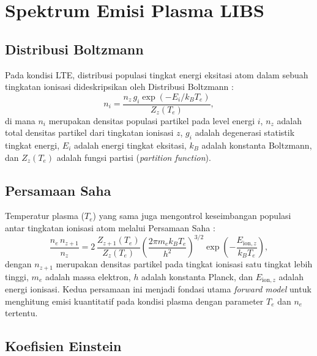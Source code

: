 \section{Spektrum Emisi Plasma LIBS}

\subsection{Distribusi Boltzmann}

Pada kondisi LTE, distribusi populasi tingkat energi eksitasi atom dalam sebuah tingkatan ionisasi dideskripsikan oleh Distribusi Boltzmann \citep{fujimoto_plasma_2004}:
\begin{equation} \label{eq:bab2_boltzmann}
n_i = \frac{n_z \, g_i \exp(-E_i / k_B T_e)}{Z_z(T_e)},
\end{equation}
di mana $n_i$ merupakan densitas populasi partikel pada level energi $i$, $n_z$ adalah total densitas partikel dari tingkatan ionisasi $z$, $g_i$ adalah degenerasi statistik tingkat energi, $E_i$ adalah energi tingkat eksitasi, $k_B$ adalah konstanta Boltzmann, dan $Z_z(T_e)$ adalah fungsi partisi (\textit{partition function}).

\subsection{Persamaan Saha}

Temperatur plasma ($T_e$) yang sama juga mengontrol keseimbangan populasi antar tingkatan ionisasi atom melalui Persamaan Saha \citep{fujimoto_plasma_2004}:
\begin{equation} \label{eq:bab2_saha}
\frac{n_e \, n_{z+1}}{n_z} = 2\,\frac{Z_{z+1}(T_e)}{Z_z(T_e)} \left(\frac{2\pi m_e k_B T_e}{h^2}\right)^{3/2} \exp\!\left(-\frac{E_{\mathrm{ion},z}}{k_B T_e}\right),
\end{equation}
dengan $n_{z+1}$ merupakan densitas partikel pada tingkat ionisasi satu tingkat lebih tinggi, $m_e$ adalah massa elektron, $h$ adalah konstanta Planck, dan $E_{\mathrm{ion},z}$ adalah energi ionisasi. Kedua persamaan ini menjadi fondasi utama \textit{forward model} untuk menghitung emisi kuantitatif pada kondisi plasma dengan parameter $T_e$ dan $n_e$ tertentu.

\subsection{Koefisien Einstein}


